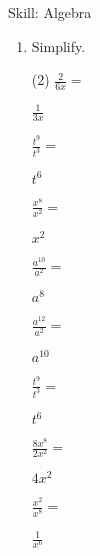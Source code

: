 \begin{bxTip}[colbacktitle=bkcolor]{Skill: Algebra}
\begin{enumerate} [leftmargin=0cm]
\item Simplify.
\begin{tasks}[label=(\alph*), after-item-skip=2pt,after-skip=3pt, label-width=4ex](2)
    \task  $ \frac{2}{6x}=                                     $            \begin{envFillIn} $  \frac{1}{3x}        $ \end{envFillIn}
    \task  $ \frac{t^9}{t^3}=                                  $            \begin{envFillIn} $  t^6                 $ \end{envFillIn}
    \task  $ \frac{x^8}{x^2}=                                  $            \begin{envFillIn} $  x^2                 $ \end{envFillIn}
    \task  $ \frac{a^{10}}{a^2}=                               $            \begin{envFillIn} $  a^8                 $ \end{envFillIn}
    \task  $ \frac{a^{12}}{a^2}=                               $            \begin{envFillIn} $  a^{10}              $ \end{envFillIn}
    \task  $ \frac{t^9}{t^3}=                                  $            \begin{envFillIn} $  t^6                 $ \end{envFillIn}
    \task  $ \frac{8x^8}{2x^2}=                                $            \begin{envFillIn} $  4x^2                $ \end{envFillIn}
    \task  $ \frac{x^2}{x^8}=                                  $            \begin{envFillIn} $  \frac{1}{x^6}       $ \end{envFillIn}
  
\end{tasks}


  


\end{enumerate}

\end{bxTip}
